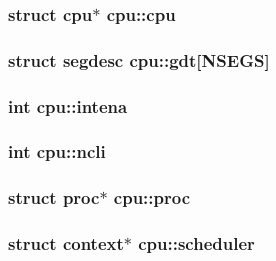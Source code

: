 \subsubsection[{\texorpdfstring{cpu}{cpu}}]{\setlength{\rightskip}{0pt plus 5cm}struct {\bf cpu}$\ast$ cpu\+::cpu}\hypertarget{structcpu_a96823491c316b96bdd2fb80fa8e270f9}{}\label{structcpu_a96823491c316b96bdd2fb80fa8e270f9}
\subsubsection[{\texorpdfstring{gdt}{gdt}}]{\setlength{\rightskip}{0pt plus 5cm}struct {\bf segdesc} cpu\+::gdt\mbox{[}{\bf N\+S\+E\+GS}\mbox{]}}\hypertarget{structcpu_aee38fb8832f8e728538b2cee877d1c09}{}\label{structcpu_aee38fb8832f8e728538b2cee877d1c09}
\subsubsection[{\texorpdfstring{intena}{intena}}]{\setlength{\rightskip}{0pt plus 5cm}int cpu\+::intena}\hypertarget{structcpu_a26fc271fea8af30d67fc2ae22ef0a82f}{}\label{structcpu_a26fc271fea8af30d67fc2ae22ef0a82f}
\subsubsection[{\texorpdfstring{ncli}{ncli}}]{\setlength{\rightskip}{0pt plus 5cm}int cpu\+::ncli}\hypertarget{structcpu_a9ccad8ae031c295f86e96de26df24805}{}\label{structcpu_a9ccad8ae031c295f86e96de26df24805}
\subsubsection[{\texorpdfstring{proc}{proc}}]{\setlength{\rightskip}{0pt plus 5cm}struct {\bf proc}$\ast$ cpu\+::proc}\hypertarget{structcpu_a9e71a6265904fd644875a9ea5a413c89}{}\label{structcpu_a9e71a6265904fd644875a9ea5a413c89}
\subsubsection[{\texorpdfstring{scheduler}{scheduler}}]{\setlength{\rightskip}{0pt plus 5cm}struct {\bf context}$\ast$ cpu\+::scheduler}\hypertarget{structcpu_aaa1510fdf8a2230c033d04e13e4fdd9e}{}\label{structcpu_aaa1510fdf8a2230c033d04e13e4fdd9e}
